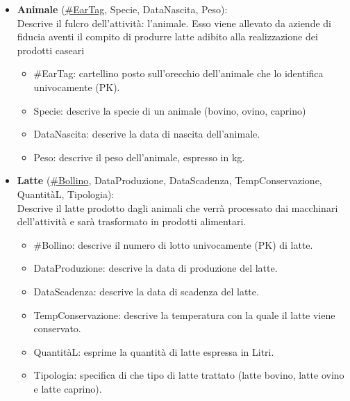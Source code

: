 \documentclass[12pt]{report}
\begin{document}
\begin{itemize}
\item \textbf{Animale} (\underline{\#EarTag}, Specie, DataNascita, Peso):\\
Descrive il fulcro dell’attività: l’animale. Esso viene allevato da aziende di fiducia aventi il compito di produrre latte adibito alla realizzazione dei prodotti caseari
\begin{itemize}
\item \#EarTag: cartellino posto sull’orecchio dell’animale che  lo identifica univocamente (PK).
\item Specie: descrive la specie di un animale (bovino, ovino, caprino)
\item DataNascita: descrive la data di nascita dell’animale.
\item Peso: descrive il peso dell'animale, espresso in kg.
\end{itemize}

\item \textbf{Latte }(\underline{\#Bollino}, DataProduzione, DataScadenza, TempConservazione, QuantitàL, Tipologia):\\
Descrive il latte prodotto dagli animali che verrà processato dai macchinari dell’attività e sarà trasformato in prodotti alimentari.

\begin{itemize}
\item \#Bollino: descrive il numero di lotto univocamente (PK) di latte.
\item DataProduzione: descrive la data di produzione del latte.
\item DataScadenza: descrive la data di scadenza del latte.
\item TempConservazione: descrive la temperatura con la quale il latte viene conservato.
\item QuantitàL: esprime la quantità di latte espressa in Litri.
\item Tipologia: specifica di che tipo di latte trattato (latte bovino, latte ovino e latte caprino).
\end{itemize}


\end{itemize}
\end{document}

